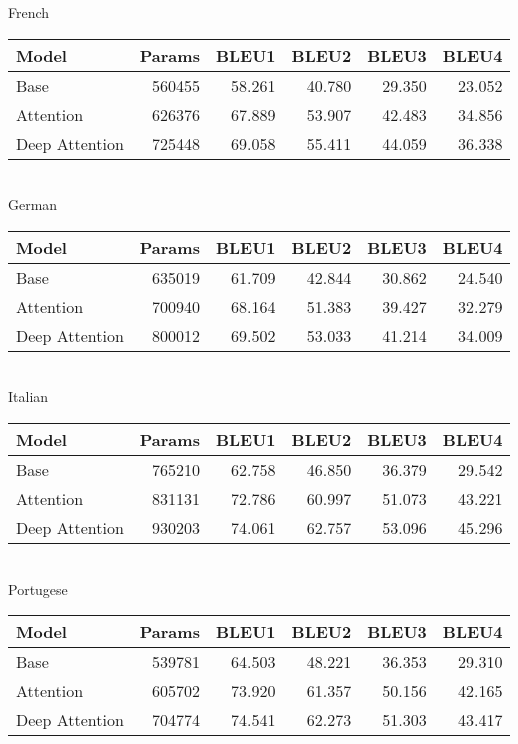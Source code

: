 French \\ 
\begin{tabular}{lrrrrr}
\toprule
          Model &  Params &   BLEU1 &   BLEU2 &   BLEU3 &   BLEU4 \\
\midrule
           Base &  560455 &  58.261 &  40.780 &  29.350 &  23.052 \\
      Attention &  626376 &  67.889 &  53.907 &  42.483 &  34.856 \\
 Deep Attention &  725448 &  69.058 &  55.411 &  44.059 &  36.338 \\
\bottomrule
\end{tabular}
 \\ 
German \\ 
\begin{tabular}{lrrrrr}
\toprule
          Model &  Params &   BLEU1 &   BLEU2 &   BLEU3 &   BLEU4 \\
\midrule
           Base &  635019 &  61.709 &  42.844 &  30.862 &  24.540 \\
      Attention &  700940 &  68.164 &  51.383 &  39.427 &  32.279 \\
 Deep Attention &  800012 &  69.502 &  53.033 &  41.214 &  34.009 \\
\bottomrule
\end{tabular}
 \\ 
Italian \\ 
\begin{tabular}{lrrrrr}
\toprule
          Model &  Params &   BLEU1 &   BLEU2 &   BLEU3 &   BLEU4 \\
\midrule
           Base &  765210 &  62.758 &  46.850 &  36.379 &  29.542 \\
      Attention &  831131 &  72.786 &  60.997 &  51.073 &  43.221 \\
 Deep Attention &  930203 &  74.061 &  62.757 &  53.096 &  45.296 \\
\bottomrule
\end{tabular}
 \\ 
Portugese \\ 
\begin{tabular}{lrrrrr}
\toprule
          Model &  Params &   BLEU1 &   BLEU2 &   BLEU3 &   BLEU4 \\
\midrule
           Base &  539781 &  64.503 &  48.221 &  36.353 &  29.310 \\
      Attention &  605702 &  73.920 &  61.357 &  50.156 &  42.165 \\
 Deep Attention &  704774 &  74.541 &  62.273 &  51.303 &  43.417 \\
\bottomrule
\end{tabular}
